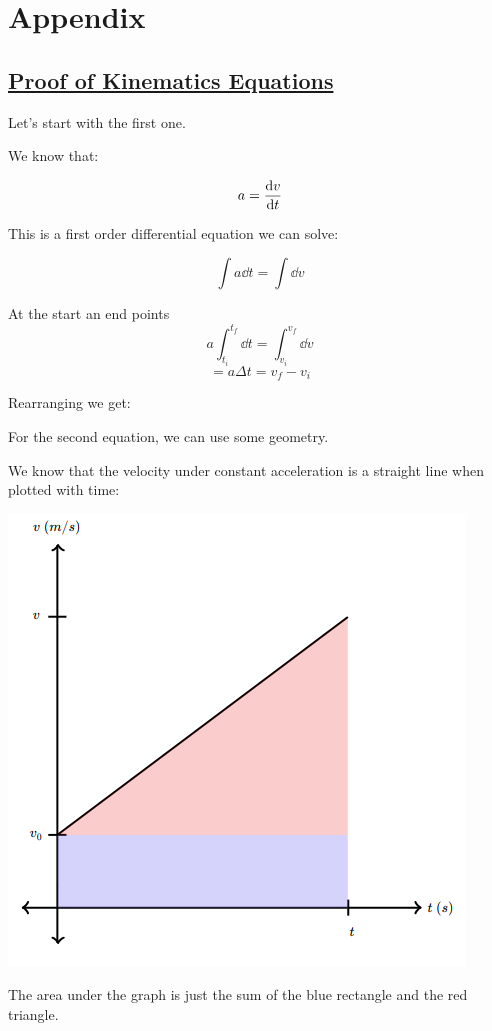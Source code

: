 \documentclass{report}
\begin{document}
\chapter{Appendix}
\section{\hyperref[th:kin]{Proof of Kinematics Equations}}
\label{sec:kin}

Let's start with the first one.

We know that:

$$a=\dv{v}{t}$$

This is a first order differential equation we can solve:

$$\int{ a \dd t} = \int{ \dd v}$$

At the start an end points
$$a\int_{t_i}^{t_f}{ \dd t} = \int_{v_i}^{v_f}{ \dd v}$$
$$= a \Delta t = v_f - v_i$$

Rearranging we get:



For the second equation, we can use some geometry.

We know that the velocity under constant acceleration is a straight line when plotted with time:

\includegraphics[scale=0.5]{vel_time.png}

The area under the graph is just the sum of the blue rectangle and the red triangle.
\end{document}
